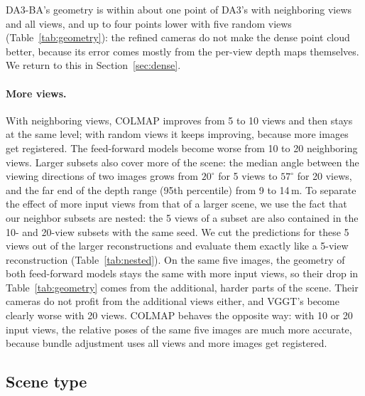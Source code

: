 \documentclass[10pt,twocolumn,letterpaper]{article}
\begin{document}
DA3-BA's geometry is within about one point of DA3's with neighboring views and all views, and up to four points
lower with five random views (Table~\ref{tab:geometry}): the refined cameras do not make the dense point cloud better, because its error comes mostly from the per-view depth maps
themselves. We return to this in Section~\ref{sec:dense}.

\paragraph{More views.}
With neighboring views, COLMAP improves from 5 to 10 views and then stays at the same level; with random views it
keeps improving, because more images get registered. The feed-forward models become worse from 10 to 20
neighboring views. Larger subsets also cover more of the scene: the median angle between the viewing directions
of two images grows from $20^\circ$ for 5 views to $57^\circ$ for 20 views, and the far end of the depth range
(95th percentile) from 9 to 14\,m. To separate the effect of more input views from that of a larger scene, we use
the fact that our neighbor subsets are nested: the 5 views of a subset are also contained in the 10- and 20-view
subsets with the same seed. We cut the predictions for these 5 views out of the larger reconstructions and
evaluate them exactly like a 5-view reconstruction (Table~\ref{tab:nested}). On the same five images, the geometry
of both feed-forward models stays the same with more input views, so their drop in Table~\ref{tab:geometry}
comes from the additional, harder parts of the scene. Their cameras do not profit from the additional views
either, and VGGT's become clearly worse with 20 views. COLMAP behaves the opposite way: with 10 or 20 input views,
the relative poses of the same five images are much more accurate, because bundle adjustment uses all views and
more images get registered.

\begin{table}[t]
\centering

\caption{The same five neighboring views, reconstructed alone or as part of 10 or 20 input views (24 subsets).
COLMAP's fused point cloud cannot be split by view, so only its cameras are evaluated.}
\label{tab:nested}
\end{table}

\subsection{Scene type}
\end{document}
